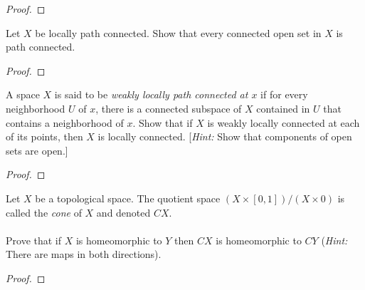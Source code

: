 \begin{proof}
\end{proof}
\newpage
\begin{problem}[Munkres \S25, Ex.\,4]
Let $X$ be locally path connected. Show that every connected open
set in $X$ is path connected.
\end{problem}
\begin{proof}
\end{proof}
\newpage
\begin{problem}[Munkres \S25, Ex.\,6]
A space $X$ is said to be \emph{weakly locally path connected at
  $x$} if for every neighborhood $U$ of $x$, there is a connected
subspace of $X$ contained in $U$ that contains a neighborhood of
$x$. Show that if $X$ is weakly locally connected at each of its
points, then $X$ is locally connected. [\emph{Hint:} Show that
components of open sets are open.]
\end{problem}
\begin{proof}
\end{proof}
\newpage
\begin{problem}[A]
Let $X$ be a topological space. The quotient space
$(X\times[0,1])/(X\times 0)$ is called the \emph{cone} of $X$ and
denoted $CX$.
\\\\
Prove that if $X$ is homeomorphic to $Y$ then $CX$ is
homeomorphic to $CY$ (\emph{Hint:} There are maps in both
directions).
\end{problem}
\begin{proof}
\end{proof}

